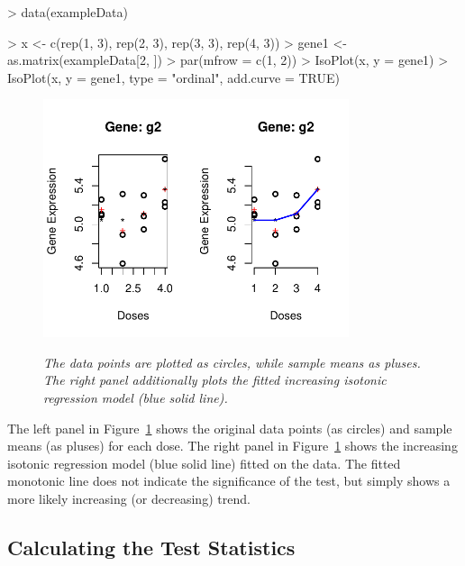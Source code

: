 \documentclass[10pt]{article}
\begin{document}
\begin{Schunk}
\begin{Sinput}
> data(exampleData)
\end{Sinput}
\end{Schunk}


\begin{Schunk}
\begin{Sinput}
> x <- c(rep(1, 3), rep(2, 3), rep(3, 3), rep(4, 3))
> gene1 <- as.matrix(exampleData[2, ])
> par(mfrow = c(1, 2))
> IsoPlot(x, y = gene1)
> IsoPlot(x, y = gene1, type = "ordinal", add.curve = TRUE)
\end{Sinput}
\end{Schunk}
 
 
 

\begin{figure}[!h]
\centering
{\includegraphics[width=0.8\textwidth]{IsoGene-IsoPlot.pdf}}
\caption{\em{The data points are plotted as circles, while sample
means as pluses. The right panel additionally plots the fitted
increasing isotonic regression model (blue solid line).}}
\label{exgene}
\end{figure}




The left panel in Figure~\ref{exgene} shows the original data points
(as circles) and sample means (as pluses) for each dose. The right
panel in Figure~\ref{exgene} shows the increasing isotonic
regression model (blue solid line) fitted on the data. The fitted
monotonic line does not indicate the significance of the test, but
simply shows a more likely increasing (or decreasing) trend.


\subsection{Calculating the Test Statistics}
\end{document}
